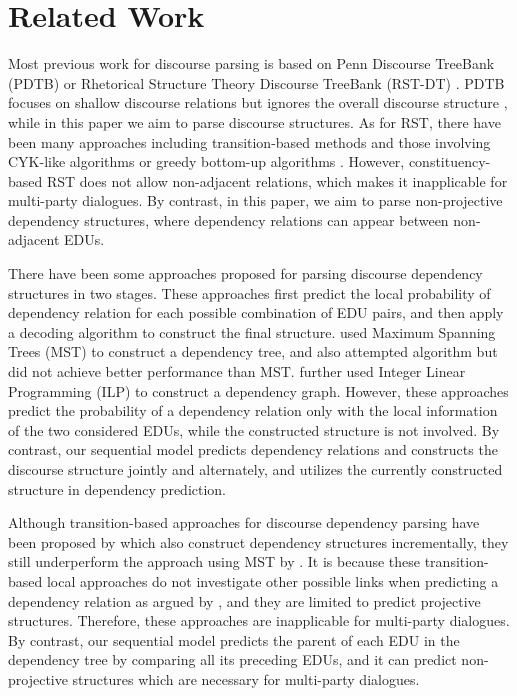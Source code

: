 \documentclass[letterpaper]{article} \usepackage{aaai19}  \usepackage{times}  \usepackage{helvet}  \usepackage{courier}  \usepackage{url}  \usepackage{graphicx}  \usepackage{amssymb}
\begin{document}
\section{Related Work}

Most previous work for discourse parsing is based on Penn Discourse TreeBank (PDTB) \cite{prasad2007penn} or Rhetorical Structure Theory Discourse
TreeBank (RST-DT) \cite{mann1988rhetorical}. 
PDTB focuses on shallow discourse relations but ignores the overall discourse structure \cite{yang2018scidtb}, while in this paper we aim to parse discourse structures.
As for RST, there have been many approaches including transition-based methods  \cite{braud2017cross,wang2017two,yu2018transition} and those involving CYK-like algorithms \cite{joty2015codra,li2016discourse,liu2017learning} or greedy bottom-up algorithms \cite{feng2014linear}. 
However, constituency-based RST does not allow non-adjacent relations, which makes it inapplicable for multi-party dialogues.
By contrast, in this paper, we aim to parse non-projective dependency structures, where dependency relations can appear between non-adjacent EDUs.

There have been some approaches proposed for parsing discourse dependency structures in two stages.
These approaches first predict the local probability of dependency relation for each possible combination of EDU pairs, and then apply a decoding algorithm to construct the final structure. \cite{muller2012constrained,li2014text,afantenos2015discourse} used Maximum Spanning Trees (MST) to construct a dependency tree, and \cite{muller2012constrained} also attempted  algorithm but did not achieve better performance than MST.
\cite{perret2016integer} further used Integer Linear Programming (ILP) to construct a dependency graph. 
However, these approaches predict the probability of a dependency relation only with the local information of the two considered EDUs, while the constructed structure is not involved.
By contrast, our sequential model predicts dependency relations and constructs the discourse structure jointly and alternately, and utilizes the currently constructed structure in dependency prediction.

Although transition-based approaches for discourse dependency parsing have been proposed by \cite{jia2018improved,jia2018modeling} which also construct dependency structures incrementally, they still underperform the approach using MST by \cite{li2014text}. It is because these transition-based local approaches do not investigate other possible links when predicting a dependency relation as argued by \cite{jia2018modeling}, and they are limited to predict projective structures.
Therefore, these approaches are inapplicable for multi-party dialogues.
By contrast, our sequential model predicts the parent of each EDU in the dependency tree by comparing all its preceding EDUs, and it can predict non-projective structures which are necessary for multi-party dialogues.
\end{document}

